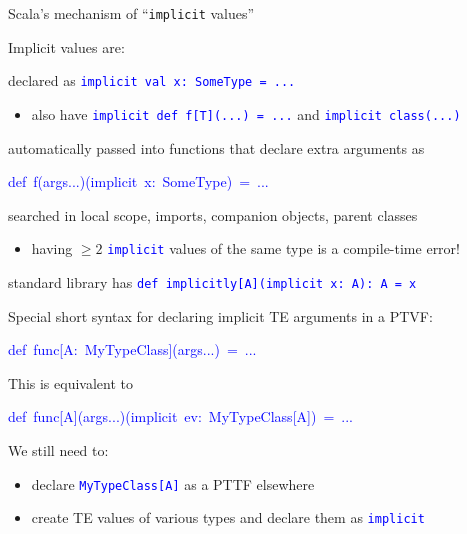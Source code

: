 \documentclass[english]{beamer}
\newenvironment{lyxcode}
   {\par\begin{list}{}{
     \setlength{\rightmargin}{\leftmargin}
     \setlength{\listparindent}{0pt}%
     \raggedright
     \setlength{\itemsep}{0pt}
     \setlength{\parsep}{0pt}
     \normalfont\ttfamily}%
    \def\{{\char`\{}
    \def\}{\char`\}}
    \def\textasciitilde{\char`\~}
    \item[]}
   {\end{list}}
\begin{document}
\begin{frame}{Scala's mechanism of ``\texttt{implicit} values''}

Implicit values are:
\begin{itemize}
\item declared as \texttt{\textcolor{blue}{\footnotesize{}implicit val x:\ SomeType
= ...}}{\footnotesize \par}
\begin{itemize}
\item also have \texttt{\textcolor{blue}{\footnotesize{}implicit def f{[}T{]}(...)\ =
...}} and \texttt{\textcolor{blue}{\footnotesize{}implicit class(...)}}{\footnotesize \par}
\end{itemize}
\item automatically passed into functions that declare extra arguments as
\begin{lyxcode}
\textcolor{blue}{\footnotesize{}def~f(args...)(implicit~x:~SomeType)~=~...}{\footnotesize \par}
\end{lyxcode}
\item searched in local scope, imports, companion objects, parent classes
\begin{itemize}
\item having $\geq2$ \texttt{\textcolor{blue}{\footnotesize{}implicit}}
values of the same type is a compile-time error!
\end{itemize}
\item standard library has \texttt{\textcolor{blue}{\footnotesize{}def implicitly{[}A{]}(implicit
x:\ A):\ A = x}}{\footnotesize \par}
\end{itemize}
Special short syntax for declaring implicit TE arguments in a PTVF:
\begin{lyxcode}
\textcolor{blue}{\footnotesize{}def~func{[}A:~MyTypeClass{]}(args...)~=~...}{\footnotesize \par}
\end{lyxcode}
This is equivalent to
\begin{lyxcode}
\textcolor{blue}{\footnotesize{}def~func{[}A{]}(args...)(implicit~ev:~MyTypeClass{[}A{]})~=~...}{\footnotesize \par}
\end{lyxcode}
We still need to:
\begin{itemize}
\item declare \texttt{\textcolor{blue}{\footnotesize{}MyTypeClass{[}A{]}}}
as a PTTF elsewhere
\item create TE values of various types and declare them as \texttt{\textcolor{blue}{\footnotesize{}implicit}}
\ 
\end{itemize}
\end{frame}
\end{document}
